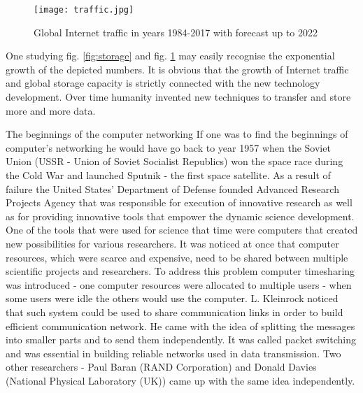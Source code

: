\documentclass[magisterska,en]{pracamgr}
\begin{document}
\begin{figure}[h]
    \centering
    \texttt{[image: traffic.jpg]}
    \caption{Global Internet traffic in years 1984-2017 with forecast up to 2022}
    \label{fig:traffic}
\end{figure}

One studying fig. \ref{fig:storage} and fig. \ref{fig:traffic} may easily recognise the exponential growth of the depicted numbers. It is obvious that the growth of Internet traffic and global storage capacity is strictly connected with the new technology development. Over time humanity invented new techniques to transfer and store more and more data.



The beginnings of the computer networking
If one was to find the beginnings of computer's networking he would have go back to year 1957 when the Soviet Union (USSR - Union of Soviet Socialist Republics) won the space race during the Cold War and launched Sputnik - the first space satellite. As a result of failure the United States' Department of Defense founded Advanced Research Projects Agency that was responsible for execution of innovative research as well as for providing innovative tools that empower the dynamic science development.\cite{Internet_History_article} One of the tools that were used for science that time were computers that created new possibilities for various researchers. It was noticed at once that computer resources, which were scarce and expensive, need to be shared between multiple scientific projects and researchers. To address this problem computer timesharing was introduced - one computer resources were allocated to multiple users - when some users were idle the others would use the computer. L. Kleinrock noticed that such system could be used to share communication links in order to build efficient communication network. He came with the idea of splitting the messages into smaller parts and to send them independently. It was called packet switching and was essential in building reliable networks used in data transmission. Two other researchers - Paul Baran (RAND Corporation) and Donald Davies (National Physical Laboratory (UK)) came up with the same idea independently.
\end{document}
